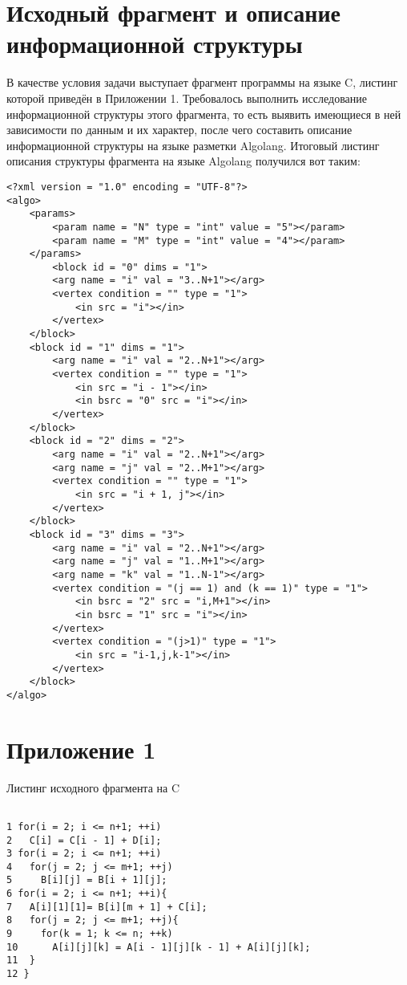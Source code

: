 \documentclass[a4paper,12pt,oneside,openleft]{memoir}
\begin{document}
	
\section{Исходный фрагмент и описание информационной структуры} 
В качестве условия задачи выступает фрагмент программы на языке C, листинг которой приведён
в Приложении 1. Требовалось выполнить исследование информационной структуры этого
фрагмента, то есть выявить имеющиеся в ней зависимости по данным и их характер, после чего
составить описание информационной структуры на языке разметки Algolang. Итоговый листинг
описания структуры фрагмента на языке Algolang получился вот таким:

\lstset{language=XML}
\begin{lstlisting}
<?xml version = "1.0" encoding = "UTF-8"?>
<algo>
	<params>
		<param name = "N" type = "int" value = "5"></param>
		<param name = "M" type = "int" value = "4"></param>
	</params>
		<block id = "0" dims = "1">
		<arg name = "i" val = "3..N+1"></arg>
		<vertex condition = "" type = "1">
			<in src = "i"></in>
		</vertex>
	</block>
	<block id = "1" dims = "1">
		<arg name = "i" val = "2..N+1"></arg>
		<vertex condition = "" type = "1">
			<in src = "i - 1"></in>
			<in bsrc = "0" src = "i"></in>
		</vertex>
	</block>
	<block id = "2" dims = "2">
		<arg name = "i" val = "2..N+1"></arg>
		<arg name = "j" val = "2..M+1"></arg>
		<vertex condition = "" type = "1">
			<in src = "i + 1, j"></in>
		</vertex>
	</block>
	<block id = "3" dims = "3">
		<arg name = "i" val = "2..N+1"></arg>
		<arg name = "j" val = "1..M+1"></arg>
		<arg name = "k" val = "1..N-1"></arg>
		<vertex condition = "(j == 1) and (k == 1)" type = "1">
			<in bsrc = "2" src = "i,M+1"></in>
			<in bsrc = "1" src = "i"></in>
		</vertex>
		<vertex condition = "(j>1)" type = "1">
			<in src = "i-1,j,k-1"></in>
		</vertex>
	</block>
</algo>
\end{lstlisting}

\section{Приложение 1}
Листинг исходного фрагмента на C


\begin{verbatim}

1 for(i = 2; i <= n+1; ++i)
2   C[i] = C[i - 1] + D[i];
3 for(i = 2; i <= n+1; ++i)
4   for(j = 2; j <= m+1; ++j)
5     B[i][j] = B[i + 1][j];
6 for(i = 2; i <= n+1; ++i){
7   A[i][1][1]= B[i][m + 1] + C[i];
8   for(j = 2; j <= m+1; ++j){
9 	  for(k = 1; k <= n; ++k)
10 	    A[i][j][k] = A[i - 1][j][k - 1] + A[i][j][k];
11 	}
12 }
\end{verbatim}



     	
\end{document}
